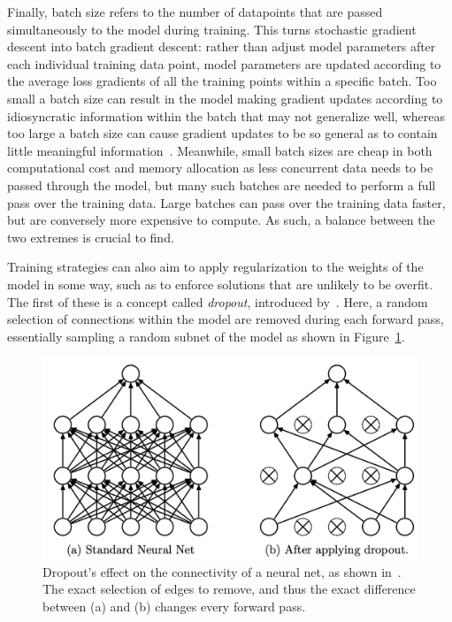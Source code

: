 Finally, batch size refers to the number of datapoints that are passed simultaneously to the model during training. This
turns stochastic gradient descent into batch gradient descent: rather than adjust model parameters after each individual
training data point, model parameters are updated according to the average loss gradients of all the training points within a
specific batch. Too small a batch size can result in the model making gradient updates according to idiosyncratic
information within the batch that may not generalize well, whereas too large a batch size can cause gradient updates to be
so general as to contain little meaningful information~\citep{smith2017}. Meanwhile, small batch sizes are cheap in both
computational cost and memory allocation as less concurrent data needs to be passed through the model, but many such
batches are needed to perform a full pass over the training data. Large batches can pass over the training data faster, but are
conversely more expensive to compute. As such, a balance between the two extremes is crucial to find.

Training strategies can also aim to apply regularization to the weights of the model in some way, such as to enforce
solutions that are unlikely to be overfit. The first of these is a concept called \textit{dropout}, introduced by~\cite{srivastava2014}.
Here, a random selection of connections within the model are removed
during each forward pass, essentially sampling a random subnet of the model as shown in Figure~\ref{fig:dropout}.

\begin{figure}[ht!]
	\centering
	\includegraphics[width=.75\textwidth]{training/dropout}
	\caption[Dropout's effect on network connectivity]{Dropout's effect on the connectivity of a neural net, as shown in~\cite{srivastava2014}.
	The exact selection of edges to remove, and thus the exact difference between (a) and (b) changes every forward pass.}
	\label{fig:dropout}
\end{figure}

